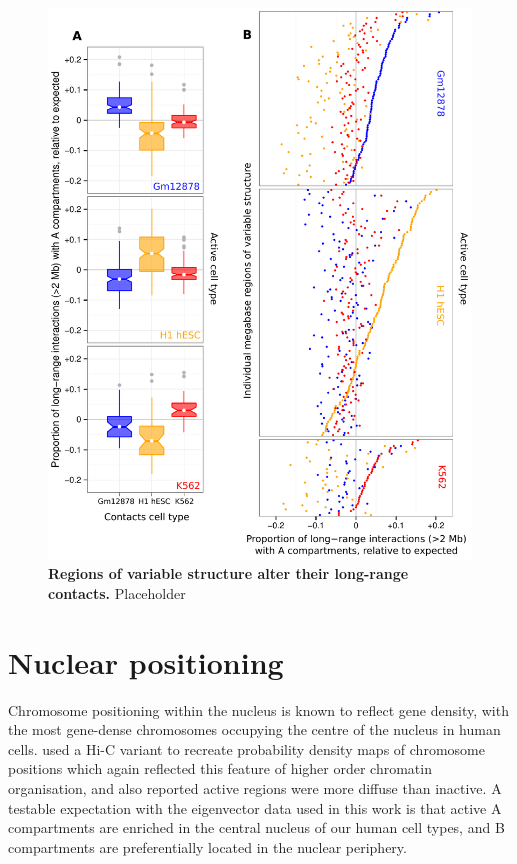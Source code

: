 \documentclass[a4paper,10pt,oneside]{book}
\begin{document}
\begin{figure}
\begin{center} 
\includegraphics[width=.9\textwidth]{figs/longrange.pdf}
\captionsetup{width=\textwidth} 
\caption{ {\bf Regions of variable structure alter their long-range contacts. }
Placeholder
}\label{fig:longrange}
\end{center} 
\end{figure} 


\section{Nuclear positioning}

Chromosome positioning within the nucleus is known to reflect gene density, with the most gene-dense chromosomes occupying the centre of the nucleus in human cells.\cite{Bickmore2013} \citet{Kalhor2012} used a Hi-C variant to recreate probability density maps of chromosome positions which again reflected this feature of higher order chromatin organisation, and also reported active regions were more diffuse than inactive. A testable expectation with the eigenvector data used in this work is that active A compartments are enriched in the central nucleus of our human cell types, and B compartments are preferentially located in the nuclear periphery.
\end{document}
